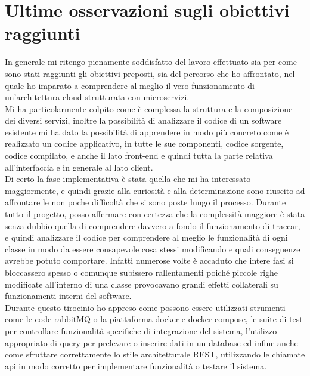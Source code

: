 \documentclass[a4paper,titlepage,12pt]{book}
\begin{document}
\section{\sffamily
Ultime osservazioni sugli obiettivi raggiunti}
In generale mi ritengo pienamente soddisfatto del lavoro effettuato sia per come sono stati raggiunti gli obiettivi preposti, sia del percorso che ho affrontato, nel quale ho imparato a comprendere al meglio il vero funzionamento di un'architettura cloud strutturata con microservizi.\\
Mi ha particolarmente colpito come è complessa la struttura e la composizione dei diversi servizi, inoltre la possibilità di analizzare il codice di un software esistente mi ha dato la possibilità di apprendere in modo più concreto come è realizzato un codice applicativo, in tutte le sue componenti, codice sorgente, codice compilato, e anche il lato front-end e quindi tutta la parte relativa all'interfaccia e in generale al lato client.\\
Di certo la fase implementativa è stata quella che mi ha interessato maggiormente, e quindi grazie alla curiosità e alla determinazione sono riuscito ad affrontare le non poche difficoltà che si sono poste lungo il processo. Durante tutto il progetto, posso affermare con certezza che la complessità maggiore è stata senza dubbio quella di comprendere davvero a fondo il funzionamento di traccar, e quindi analizzare il codice per comprendere al meglio le funzionalità di ogni classe in modo da essere consapevole cosa stessi modificando e quali conseguenze avrebbe potuto comportare. Infatti numerose volte è accaduto che intere fasi si bloccassero spesso o comunque subissero rallentamenti poiché piccole righe modificate all'interno di una classe provocavano grandi effetti collaterali su funzionamenti interni del software.\\
Durante questo tirocinio ho appreso come possono essere utilizzati strumenti come le code rabbitMQ o la piattaforma docker e docker-compose, le suite di test per controllare funzionalità specifiche di integrazione del sistema, l'utilizzo appropriato di query per prelevare o inserire dati in un database ed infine anche come sfruttare correttamente lo stile architetturale REST, utilizzando le chiamate api in modo corretto per implementare funzionalità o testare il sistema.
\end{document}
